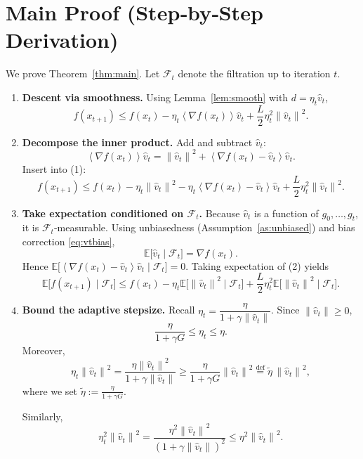 \documentclass{article}
\newcommand{\E}{\mathbb{E}}
\newcommand{\norm}[1]{\left\|#1\right\|}
\newcommand{\inner}[1]{\left\langle#1\right\rangle}
\begin{document}
\section*{Main Proof (Step‑by‑Step Derivation)}
We prove Theorem~\ref{thm:main}. Let $\mathcal{F}_{t}$ denote the filtration up to iteration $t$.

\begin{enumerate}
\item[Step 1.] \textbf{Descent via smoothness.}
Using Lemma~\ref{lem:smooth} with $d=\eta_{t}\hat v_{t}$,
\[
f(x_{t+1})\le f(x_{t})-\eta_{t}\inner{\nabla f(x_{t})}{\hat v_{t}}+\frac{L}{2}\eta_{t}^{2}\norm{\hat v_{t}}^{2}. \tag{1}
\]

\item[Step 2.] \textbf{Decompose the inner product.}
Add and subtract $\hat v_{t}$:
\[
\inner{\nabla f(x_{t})}{\hat v_{t}}
= \norm{\hat v_{t}}^{2}+\inner{\nabla f(x_{t})-\hat v_{t}}{\hat v_{t}}.
\]
Insert into (1):
\[
f(x_{t+1})\le f(x_{t})-\eta_{t}\norm{\hat v_{t}}^{2}
-\eta_{t}\inner{\nabla f(x_{t})-\hat v_{t}}{\hat v_{t}}
+\frac{L}{2}\eta_{t}^{2}\norm{\hat v_{t}}^{2}. \tag{2}
\]

\item[Step 3.] \textbf{Take expectation conditioned on $\mathcal{F}_{t}$.}
Because $\hat v_{t}$ is a function of $g_{0},\dots,g_{t}$, it is $\mathcal{F}_{t}$‑measurable. Using unbiasedness (Assumption~\ref{as:unbiased}) and bias correction \eqref{eq:vtbias},
\[
\E\bigl[\hat v_{t}\mid\mathcal{F}_{t}\bigr]=\nabla f(x_{t}).
\]
Hence $\E\bigl[\inner{\nabla f(x_{t})-\hat v_{t}}{\hat v_{t}}\mid\mathcal{F}_{t}\bigr]=0$.
Taking expectation of (2) yields
\[
\E\bigl[f(x_{t+1})\mid\mathcal{F}_{t}\bigr]
\le f(x_{t})-\eta_{t}\E\bigl[\norm{\hat v_{t}}^{2}\mid\mathcal{F}_{t}\bigr]
+\frac{L}{2}\eta_{t}^{2}\E\bigl[\norm{\hat v_{t}}^{2}\mid\mathcal{F}_{t}\bigr]. \tag{3}
\]

\item[Step 4.] \textbf{Bound the adaptive stepsize.}
Recall $\eta_{t}= \dfrac{\eta}{1+\gamma\norm{\hat v_{t}}}$. Since $\norm{\hat v_{t}}\ge0$,
\[
\frac{\eta}{1+\gamma G}\le \eta_{t}\le \eta.
\]
Moreover,
\[
\eta_{t}\norm{\hat v_{t}}^{2}
= \frac{\eta\norm{\hat v_{t}}^{2}}{1+\gamma\norm{\hat v_{t}}}
\ge \frac{\eta}{1+\gamma G}\norm{\hat v_{t}}^{2}
\stackrel{\text{def}}{=}\tilde\eta\,\norm{\hat v_{t}}^{2},
\]
where we set $\tilde\eta:=\frac{\eta}{1+\gamma G}$.

Similarly,
\[
\eta_{t}^{2}\norm{\hat v_{t}}^{2}
= \frac{\eta^{2}\norm{\hat v_{t}}^{2}}{(1+\gamma\norm{\hat v_{t}})^{2}}
\le \eta^{2}\norm{\hat v_{t}}^{2}.
\]


\end{enumerate}
\end{document}
